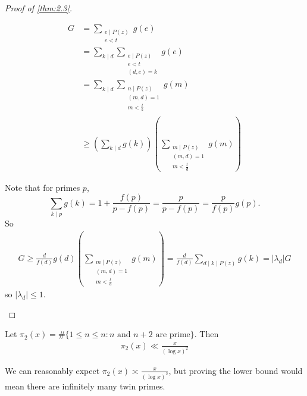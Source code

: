 \documentclass{article}
\begin{document}
\begin{proof}[Proof of \cref{thm:2.3}]
\begin{enumerate}
    \begin{align*}
      G &= \sum_{\substack{e \mid P(z) \\ e<t}} g(e) \\
        &= \sum_{k \mid d} \sum_{\substack{e \mid P(z) \\ e < t \\ (d,e)=k}} g(e) \\
        &= \sum_{k \mid d} \sum_{\substack{n \mid P(z) \\ (m,d) = 1 \\ m < \frac{t}{k}}} g(m) \\
        &\geq \left(\sum_{k \mid d} g(k)\right) \left(\sum_{\substack{m \mid P(z) \\ (m,d) = 1 \\ m < \frac{t}{d}}} g(m)\right)
    \end{align*}

    Note that for primes $p$,
    \begin{equation*}
      \sum_{k \mid p} g(k) = 1 + \frac{f(p)}{p - f(p)} = \frac{p}{p - f(p)} = \frac{p}{f(p)} g(p).
    \end{equation*}
    So
    \begin{align*}
      G \geq \frac{d}{f(d)} g(d) \left(\sum_{\substack{m \mid P(z) \\ (m,d) = 1 \\ m < \frac{t}{d}}} g(m)\right) = \frac{d}{f(d)} \sum_{d \mid k \mid P(z)} g(k) = |\lambda_d| G
    \end{align*}
  so $|\lambda_d| \leq 1$. \qedhere
\end{enumerate}
\end{proof}
\begin{nthm}[Brun]\label{thm:2.5}
  Let $\pi_2(x) = \# \{1 \leq n \leq n : n \text{ and } n+2 \text{ are prime}\}$.
  Then
  \begin{align*}
    \pi_2(x) \ll \frac{x}{(\log x)^2}
  \end{align*}
\end{nthm}
We can reasonably expect $\pi_2(x) \asymp \frac{x}{(\log x)^2}$, but proving the lower bound would mean there are infinitely many twin primes.
\end{document}
